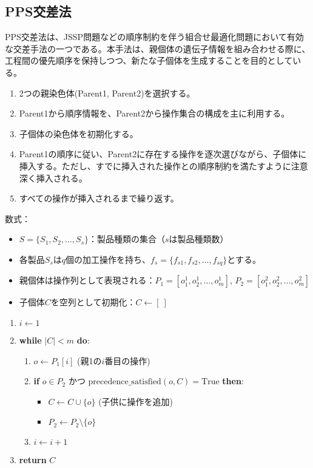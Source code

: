 \documentclass{jarticle}
\begin{document}
\subsection{PPS交差法}
PPS交差法は、JSSP問題などの順序制約を伴う組合せ最適化問題において有効な交差手法の一つである。本手法は、親個体の遺伝子情報を組み合わせる際に、工程間の優先順序を保持しつつ、新たな子個体を生成することを目的としている。
\begin{enumerate}
    \item 2つの親染色体(Parent1, Parent2)を選択する。
    \item Parent1から順序情報を、Parent2から操作集合の構成を主に利用する。
    \item 子個体の染色体を初期化する。
    \item Parent1の順序に従い、Parent2に存在する操作を逐次選びながら、子個体に挿入する。ただし、すでに挿入された操作との順序制約を満たすように注意深く挿入される。
    \item すべての操作が挿入されるまで繰り返す。
    \end{enumerate}
数式：
\begin{itemize}
    \item $S = \{S_1, S_2, \dots, S_s\}$：製品種類の集合（$s$は製品種類数）
    \item 各製品$S_s$は$q$個の加工操作を持ち、$f_s = \{f_{s1}, f_{s2}, \dots, f_{sq}\}$とする。
    \item 親個体は操作列として表現される：$P_1 = [o_1^1, o_2^1, \dots, o_m^1]$, $P_2 = [o_1^2, o_2^2, \dots, o_m^2]$
    \item 子個体$C$を空列として初期化：$C \leftarrow [\ ]$
    \end{itemize}

\begin{enumerate}
    \item $i \leftarrow 1$
    \item \textbf{while} $|C| < m$ \textbf{do}:
    \begin{enumerate}
        \item $o \leftarrow P_1[i]$ (親1の$i$番目の操作)
        \item \textbf{if} $o \in P_2$ かつ $\text{precedence\_satisfied}(o, C) = \text{True}$ \textbf{then}:
        \begin{itemize}
        \item $C \leftarrow C \cup \{o\}$ (子供に操作を追加)
        \item $P_2 \leftarrow P_2 \setminus \{o\}$
        \end{itemize}
        \item $i \leftarrow i + 1$
    \end{enumerate}
    \item \textbf{return} $C$
    \end{enumerate}
\end{document}
